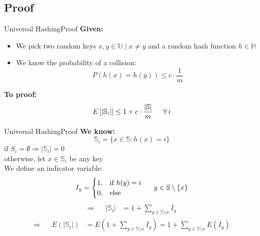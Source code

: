 \subsection{Proof}

\begin{frame}{Universal Hashing}{Proof}
  \textbf{Given:}
  \begin{itemize}
    \item<1->
      We pick two random keys {\color{Mittel-Blau}$x, y \in \mathbb{U} \mid x \neq y$} and
      a random hash function {\color{Mittel-Blau}$h \in \mathbb{H}$}
    \item<2->
      We know the probability of a collision:
      {\color{Mittel-Blau}\[P(h(x) = h(y)) \leq c \cdot \frac{1}{m}\]}
  \end{itemize}
  \textbf{To proof:}
  {\color{Mittel-Blau}\[E\left[\vert \mathbb{S}_i \vert\right]
     \leq 1 + c \cdot \frac{\vert \mathbb{S} \vert}{m}
     \hspace*{1.5em} \forall \, i\]}
\end{frame}


\begin{frame}{Universal Hashing}{Proof}
  \textbf{We know:}
         {\color{Mittel-Blau}\[\mathbb{S}_i = \{x \in \mathbb{S}: h(x) = i\}\]}
         if {\color{Mittel-Blau}$S_i = \emptyset \Rightarrow  \vert \mathbb{S}_i \vert = 0$}\\
         otherwise, let {\color{Mittel-Blau}$x \in \mathbb{S}_i$ be any key}\\
  We define an indicator variable:
  {\color{Mittel-Blau}
  \begin{displaymath}
    I_y = \begin{cases}
      1, & \text{if } h(y) = i\\
      0, & \text{else}
    \end{cases} \hspace*{1.5em} y \in \mathbb{S} \setminus \{x\}
  \end{displaymath}
  \begin{align*}
    \Rightarrow && \vert \mathbb{S}_i \vert
    & = 1 + \sum_{y \in \mathbb{S} \setminus x} I_y
  \end{align*}
  \begin{align*}
    \Rightarrow && E\left(\vert \mathbb{S}_i \vert\right)
      & = E\left(1 + \sum_{y \in \mathbb{S} \setminus x} I_y\right)
        = 1 + \sum_{y \in \mathbb{S} \setminus x} E(I_y)
  \end{align*}}
\end{frame}

